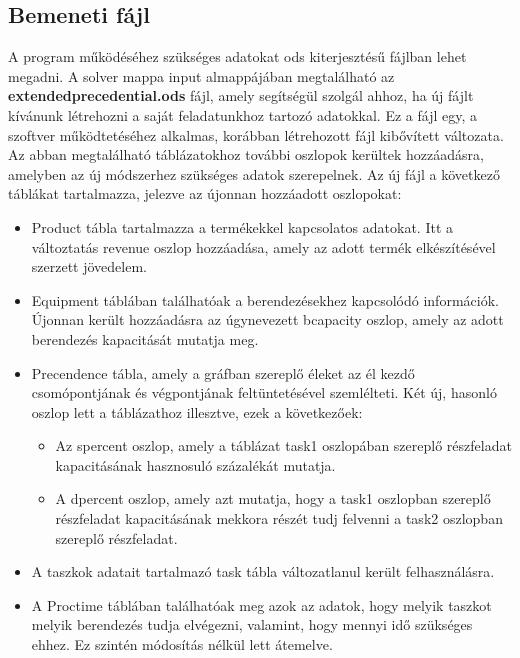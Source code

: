 \subsection{Bemeneti fájl}
A program működéséhez szükséges adatokat ods kiterjesztésű fájlban lehet megadni. A solver mappa input almappájában megtalálható az \textbf{extended\textunderscore precedential.ods} fájl, amely segítségül szolgál ahhoz, ha új fájlt kívánunk létrehozni a saját feladatunkhoz tartozó adatokkal. Ez a fájl egy, a szoftver működtetéséhez alkalmas, korábban létrehozott fájl kibővített változata. Az abban megtalálható táblázatokhoz további oszlopok kerültek hozzáadásra, amelyben az új módszerhez szükséges adatok szerepelnek. Az új fájl a következő táblákat tartalmazza, jelezve az újonnan hozzáadott oszlopokat:
\begin{itemize}
  \item Product tábla tartalmazza a termékekkel kapcsolatos adatokat. Itt a változtatás revenue oszlop hozzáadása, amely az adott termék elkészítésével szerzett jövedelem.
  \item Equipment táblában találhatóak a berendezésekhez kapcsolódó információk. Újonnan került hozzáadásra az úgynevezett b\textunderscore capacity oszlop, amely az adott berendezés kapacitását mutatja meg.
  \item Precendence tábla, amely a gráfban szereplő éleket az él kezdő csomópontjának és végpontjának feltüntetésével szemlélteti. Két új, hasonló oszlop lett a táblázathoz illesztve, ezek a következőek:
  	\begin{itemize}
  		\item Az s\textunderscore percent oszlop, amely a táblázat task1 oszlopában szereplő részfeladat kapacitásának hasznosuló százalékát mutatja.
  		\item A d\textunderscore percent oszlop, amely azt mutatja, hogy a task1 oszlopban szereplő részfeladat kapacitásának mekkora részét tudj felvenni a task2 oszlopban szereplő részfeladat.
  	\end{itemize}
  	\item A taszkok adatait tartalmazó task tábla változatlanul került felhasználásra.
  	\item A Proctime táblában találhatóak meg azok az adatok, hogy melyik taszkot melyik berendezés tudja elvégezni, valamint, hogy mennyi idő szükséges ehhez. Ez szintén módosítás nélkül lett átemelve.
\end{itemize}
